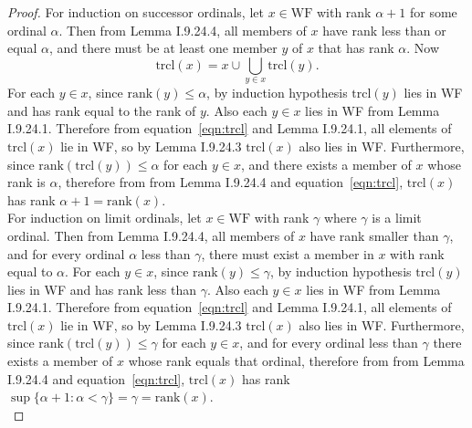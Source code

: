\documentclass{article}
\begin{document}
\begin{enumerate}
\begin{proof}
        For induction on successor ordinals, let $x\in\text{WF}$ with rank
        $\alpha+1$ for some ordinal
        $\alpha$. Then from Lemma I.9.24.4, all members of $x$ have rank
        less than or equal $\alpha$, and there must be at least one member
        $y$ of $x$ that has rank $\alpha$. Now
        \begin{equation}
          \text{trcl}(x) =x\cup\bigcup_{y\in x} \text{trcl}(y).
          \label{eqn:trcl}
        \end{equation}
        For each $y\in x$,
        since $\text{rank}(y)\leq\alpha$, by induction hypothesis
        $\text{trcl}(y)$ lies in WF and has rank equal to the rank of $y$.
        Also each $y\in x$ lies in WF from Lemma I.9.24.1. Therefore
        from equation~\eqref{eqn:trcl} and Lemma I.9.24.1, all elements of
        $\text{trcl}(x)$ lie in WF, so by Lemma I.9.24.3 $\text{trcl}(x)$
        also lies in WF. Furthermore, since
        $\text{rank}(\text{trcl}(y)) \leq\alpha$ for each $y\in x$, and
        there exists a member of $x$ whose rank is $\alpha$, therefore from
        from Lemma I.9.24.4 and equation~\eqref{eqn:trcl}, $\text{trcl}(x)$
        has rank $\alpha+1=\text{rank}(x)$. \\

        For induction on limit ordinals, let $x\in\text{WF}$ with rank
        $\gamma$ where $\gamma$ is a limit ordinal. Then from Lemma
        I.9.24.4, all members of $x$ have rank smaller than $\gamma$, and
        for every ordinal $\alpha$ less than $\gamma$, there must exist a
        member in $x$ with rank equal to $\alpha$. For each
        $y\in x$, since $\text{rank}(y)\leq\gamma$, by induction
        hypothesis $\text{trcl}(y)$ lies in WF and has rank less than
        $\gamma$. Also each $y\in x$ lies in WF from Lemma I.9.24.1.
        Therefore from equation~\eqref{eqn:trcl} and Lemma I.9.24.1, all
        elements of $\text{trcl}(x)$ lie in WF, so by Lemma I.9.24.3
        $\text{trcl}(x)$ also lies in WF. Furthermore, since
        $\text{rank}(\text{trcl}(y)) \leq\gamma$ for each $y\in x$, and for
        every ordinal less than $\gamma$
        there exists a member of $x$ whose rank equals that ordinal,
        therefore from from Lemma I.9.24.4 and equation~\eqref{eqn:trcl},
        $\text{trcl}(x)$ has rank $\sup\{\alpha+1: \alpha<\gamma\}
        =\gamma=\text{rank}(x)$. \\
      \end{proof}
  \end{enumerate}
\end{document}
